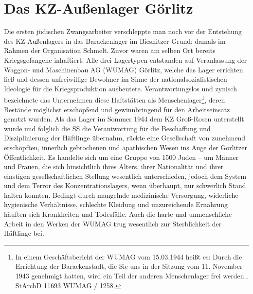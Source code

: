 \chapter{Das KZ-Außenlager Görlitz}

Die ersten jüdischen Zwangsarbeiter verschleppte man noch vor der Entstehung des KZ-Außen\-lagers in das Barackenlager im Biesnitzer Grund; damals im Rahmen der Organisation Schmelt. Zuvor waren am selben Ort bereits Kriegsgefangene inhaftiert. Alle drei Lagertypen entstanden auf Veranlassung der Waggon- und Maschinenbau AG (WUMAG) Görlitz, welche das Lager errichten ließ und dessen unfreiwillige Bewohner im Sinne der nationalsozialistischen Ideologie für die Kriegsproduktion ausbeutete. Verantwortungslos und zynisch bezeichnete das Unternehmen diese Haftstätten als \glqq Menschenlager\grqq\footnote{In einem Geschäftsbericht der WUMAG vom 15.03.1944 heißt es: \glqq Durch die Errichtung der Barackenstadt, die Sie uns in der Sitzung vom 11. November 1943 genehmigt hatten, wird ein Teil der anderen Menschenlager frei werden.\grqq, StArchD 11693 WUMAG / 1258.}, deren Bestände möglichst erschöpfend und gewinnbringend für den Arbeitseinsatz genutzt wurden. \newline
Als das Lager im Sommer 1944 dem KZ Groß-Rosen unterstellt wurde und folglich die SS die Verantwortung für die Beschaffung und Disziplinierung der Häftlinge übernahm, rückte eine Gesellschaft von zunehmend erschöpften, innerlich gebrochenen und apathischen Wesen ins Auge der Görlitzer Öffentlichkeit. Es handelte sich um eine Gruppe von 1500 Juden -- um Männer und Frauen, die sich hinsichtlich ihres Alters, ihrer Nationalität und ihrer einstigen gesellschaftlichen Stellung wesentlich unterschieden, jedoch dem System und dem Terror des Konzentrationslagers, wenn überhaupt, nur schwerlich Stand halten konnten. Bedingt durch mangelnde medizinische Versorgung, widerliche hygienische Verhältnisse, schlechte Kleidung und unzureichende Ernährung häuften sich Krankheiten und Todesfälle. Auch die harte und unmenschliche Arbeit in den Werken der WUMAG trug wesentlich zur Sterblichkeit der Häftlinge bei.
\\

